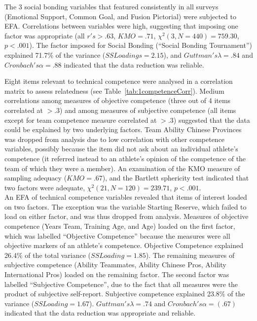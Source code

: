 \begin{CJK}{UTF8}{gbsn}
The 3 social bonding variables that featured consistently in all surveys (Emotional Support, Common Goal, and Fusion Pictorial) were subjected to EFA.  Correlations between variables were high, suggesting that imposing one factor was appropriate (all $r's > .63$, $KMO = .71$, $\chi^2(3, N = 440) =  759.30$, $p < .001$).  The factor imposed for Social Bonding (``Social Bonding Tournament'') explained 71.7\% of the variance ($SS Loadings =  2.15$), and $Guttman's \lambda =.84$ and $Cronbach's \alpha= .88$ indicated that the data reduction was reliable.


Eight items relevant to technical competence were analysed in a correlation matrix to assess relatedness (see Table~\ref{tab:1competenceCorr}). Medium correlations among measures of objective competence (three out of 4 items correlated at $> .3$) and among measures of subjective competence (all items except for team competence measure correlated at $> .3$) suggested that the data could be explained by two underlying factors. Team Ability Chinese Provinces was dropped from analysis due to low correlation with other competence variables, possibly because the item did not ask about an individual athlete's competence (it referred instead to an athlete's opinion of the competence of the team of which they were a member). An examination of the KMO measure of sampling adequacy ($KMO = .67$), and the Bartlett sphericity test indicated that two factors were adequate, $\chi^2(21, N = 120) = 239.71$, $p < .001$. \\

An EFA of technical competence variables revealed that items of interest loaded on two factors. The exception was the variable Starting Reserve, which failed to load on either factor, and was thus dropped from analysis. Measures of objective competence (Years Team, Training Age, and Age) loaded on the first factor, which was labelled ``Objective Competence'' because the measures were all objective markers of an athlete's competence.  Objective Competence explained 26.4\% of the total variance ($SS Loading = 1.85$). The remaining measures of subjective competence (Ability Teammates, Ability Chinese Pros, Ability International Pros) loaded on the remaining factor.  The second factor was labelled ``Subjective Competence'', due to the fact that all measures were the product of subjective self-report.  Subjective competence explained 23.8\% of the variance ($SS Loading = 1.67$). $Guttman's \lambda =.74$ and $Cronbach's \alpha = (.67)$ indicated that the data reduction was appropriate and reliable.


\end{CJK}
